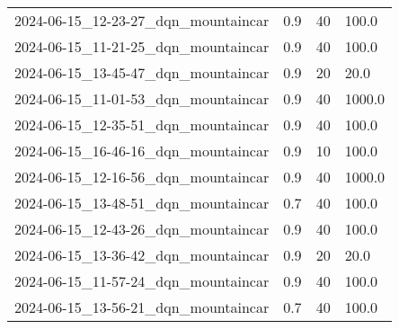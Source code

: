 \documentclass[a4paper,12pt]{article}
\begin{document}
\begin{center}
{\begin{tabular}{llll}
            2024-06-15\_12-23-27\_dqn\_mountaincar & 0.9      & 40                    & 100.0         \\
            2024-06-15\_11-21-25\_dqn\_mountaincar & 0.9      & 40                    & 100.0         \\
            2024-06-15\_13-45-47\_dqn\_mountaincar & 0.9      & 20                    & 20.0          \\
            2024-06-15\_11-01-53\_dqn\_mountaincar & 0.9      & 40                    & 1000.0        \\
            2024-06-15\_12-35-51\_dqn\_mountaincar & 0.9      & 40                    & 100.0         \\
            2024-06-15\_16-46-16\_dqn\_mountaincar & 0.9      & 10                    & 100.0         \\
            2024-06-15\_12-16-56\_dqn\_mountaincar & 0.9      & 40                    & 1000.0        \\
            2024-06-15\_13-48-51\_dqn\_mountaincar & 0.7      & 40                    & 100.0         \\
            2024-06-15\_12-43-26\_dqn\_mountaincar & 0.9      & 40                    & 100.0         \\
            2024-06-15\_13-36-42\_dqn\_mountaincar & 0.9      & 20                    & 20.0          \\
            2024-06-15\_11-57-24\_dqn\_mountaincar & 0.9      & 40                    & 100.0         \\
            2024-06-15\_13-56-21\_dqn\_mountaincar & 0.7      & 40                    & 100.0
        \end{tabular}
    }
\end{center}
\end{document}
